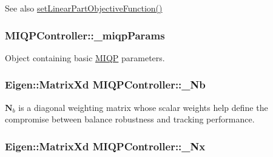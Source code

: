 \begin{DoxySeeAlso}{\-See also}
\hyperlink{classMIQPController_a2d882a4cd9e9832d8b9b2ad73111be0f}{set\-Linear\-Part\-Objective\-Function()} 
\end{DoxySeeAlso}
\hypertarget{classMIQPController_a23f6caec48541df0ebe3f91189171ce5}{
\subsubsection[{\-\_\-miqp\-Params}]{ {\bf \-M\-I\-Q\-P\-Controller\-::\-\_\-miqp\-Params}}}\label{classMIQPController_a23f6caec48541df0ebe3f91189171ce5}
\-Object containing basic \hyperlink{namespaceMIQP}{\-M\-I\-Q\-P} parameters. \hypertarget{classMIQPController_aaed002a2578a0f83c4ee59516a793f98}{
\subsubsection[{\-\_\-\-Nb}]{\setlength{\rightskip}{0pt plus 5cm}\-Eigen\-::\-Matrix\-Xd {\bf \-M\-I\-Q\-P\-Controller\-::\-\_\-\-Nb}}}\label{classMIQPController_aaed002a2578a0f83c4ee59516a793f98}
$\mathbf{N}_b$ is a diagonal weighting matrix whose scalar weights help define the compromise between balance robustness and tracking performance. \hypertarget{classMIQPController_aefaa7a13d0c690dafca85792bdbed4fd}{
\subsubsection[{\-\_\-\-Nx}]{\setlength{\rightskip}{0pt plus 5cm}\-Eigen\-::\-Matrix\-Xd {\bf \-M\-I\-Q\-P\-Controller\-::\-\_\-\-Nx}}}\label{classMIQPController_aefaa7a13d0c690dafca85792bdbed4fd}
